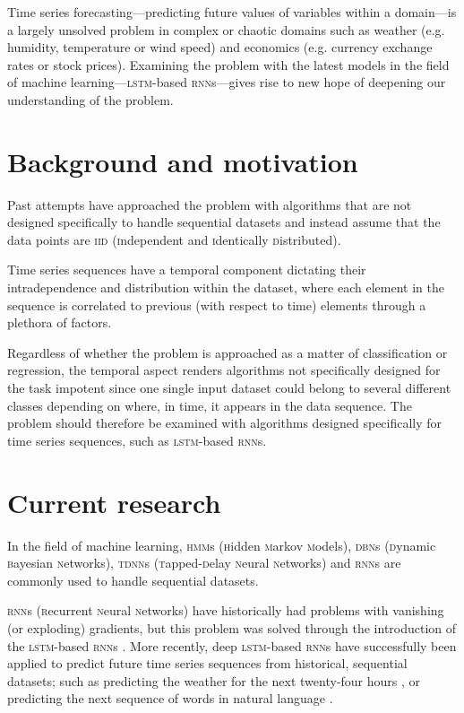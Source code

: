 Time series forecasting---predicting future values of variables within a domain---is a largely unsolved problem in complex or chaotic domains such as weather (e.g. humidity, temperature or wind speed) and economics (e.g. currency exchange rates or stock prices). Examining the problem with the latest models in the field of machine learning---\textsc{lstm}-based \textsc{rnn}s---gives rise to new hope of deepening our understanding of the problem.

\section{Background and motivation}
Past attempts have approached the problem with algorithms that are not designed specifically to handle sequential datasets and instead assume that the data points are \textsc{iid} (\textsc{i}ndependent and \textsc{i}dentically \textsc{d}istributed).

Time series sequences have a temporal component dictating their intradependence and distribution within the dataset, where each element in the sequence is correlated to previous (with respect to time) elements through a plethora of factors.

Regardless of whether the problem is approached as a matter of classification or regression, the temporal aspect renders algorithms not specifically designed for the task impotent since one single input dataset could belong to several different classes depending on where, in time, it appears in the data sequence. The problem should therefore be examined with algorithms designed specifically for time series sequences, such as \textsc{lstm}-based \textsc{rnn}s.

\section{Current research}
In the field of machine learning, \textsc{hmm}s (\textsc{h}idden \textsc{m}arkov \textsc{m}odels), \textsc{dbn}s (\textsc{d}ynamic \textsc{b}ayesian \textsc{n}etworks), \textsc{tdnn}s (\textsc{t}apped-\textsc{d}elay \textsc{n}eural \textsc{n}etworks) and \textsc{rnn}s are commonly used to handle sequential datasets.

\textsc{rnn}s (\textsc{r}ecurrent \textsc{n}eural \textsc{n}etworks) have historically had problems with vanishing (or exploding) gradients, but this problem was solved through the introduction of the \textsc{lstm}-based \textsc{rnn}s \citep*{hochreiter1997}. More recently, deep \textsc{lstm}-based \textsc{rnn}s have successfully been applied to predict future time series sequences from historical, sequential datasets; such as predicting the weather for the next twenty-four hours \citep*{zaytar2016}, or predicting the next sequence of words in natural language \citep*{quoc2014}.

